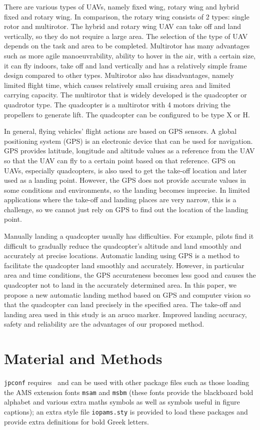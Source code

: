 \documentclass[a4paper]{jpconf}
\begin{document}
There are various types of UAVs, namely fixed wing, rotary wing and hybrid fixed and rotary wing. In comparison, the rotary wing consists of 2 types: single rotor and multirotor. The hybrid and rotary wing UAV can take off and land vertically, so they do not require a large area. The selection of the type of UAV depends on the task and area to be completed. Multirotor has many advantages such as more agile manoeuvrability, ability to hover in the air, with a certain size, it can fly indoors, take off and land vertically and has a relatively simple frame design compared to other types. Multirotor also has disadvantages, namely limited flight time, which causes relatively small cruising area and limited carrying capacity. The multirotor that is widely developed is the quadcopter or quadrotor type. The quadcopter is a multirotor with 4 motors driving the propellers to generate lift. The quadcopter can be configured to be type X or H.

In general, flying vehicles' flight actions are based on GPS sensors. A global positioning system (GPS) is an electronic device that can be used for navigation. GPS provides latitude, longitude and altitude values as a reference from the UAV so that the UAV can fly to a certain point based on that reference. GPS on UAVs, especially quadcopters, is also used to get the take-off location and later used as a landing point. However, the GPS does not provide accurate values in some conditions and environments, so the landing becomes imprecise. In limited applications where the take-off and landing places are very narrow, this is a challenge, so we cannot just rely on GPS to find out the location of the landing point.

Manually landing a quadcopter usually has difficulties. For example, pilots find it difficult to gradually reduce the quadcopter's altitude and land smoothly and accurately at precise locations. Automatic landing using GPS is a method to facilitate the quadcopter land smoothly and accurately. However, in particular area and time conditions, the GPS accurateness becomes less good and causes the quadcopter not to land in the accurately determined area\cite{ref4}. In this paper, we propose a new automatic landing method based on GPS and computer vision so that the quadcopter can land precisely in the specified area. The take-off and landing area used in this study is an aruco marker. Improved landing accuracy, safety and reliability are the advantages of our proposed method.

\section{Material and Methods}
\verb"jpconf" requires \LaTeXe\ and  can be used with other package files such
as those loading the AMS extension fonts
\verb"msam" and \verb"msbm" (these fonts provide the
blackboard bold alphabet and various extra maths symbols as well as
symbols useful in figure captions); an extra style file \verb"iopams.sty" is
provided to load these packages and provide extra definitions for bold Greek letters.
\end{document}
